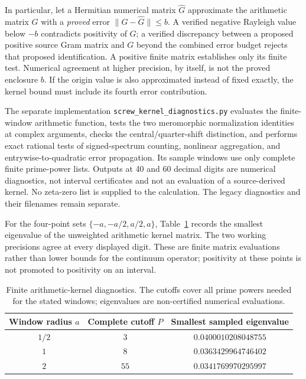 \documentclass[11pt,letterpaper]{article}
\numberwithin{equation}{section}
\theoremstyle{definition}
\theoremstyle{remark}
\begin{document}
In particular, let a Hermitian numerical matrix $\widehat G$ approximate the arithmetic matrix $G$ with a \emph{proved} error $\|G-\widehat G\|\leq b$. A verified negative Rayleigh value below $-b$ contradicts positivity of $G$; a verified discrepancy between a proposed positive source Gram matrix and $G$ beyond the combined error budget rejects that proposed identification. A positive finite matrix establishes only its finite test. Numerical agreement at higher precision, by itself, is not the proved enclosure $b$. If the origin value is also approximated instead of fixed exactly, the kernel bound must include its fourth error contribution.

The separate implementation \texttt{screw\_kernel\_diagnostics.py} evaluates the finite-window arithmetic function, tests the two meromorphic normalization identities at complex arguments, checks the central/quarter-shift distinction, and performs exact rational tests of signed-spectrum counting, nonlinear aggregation, and entrywise-to-quadratic error propagation. Its sample windows use only complete finite prime-power lists. Outputs at 40 and 60 decimal digits are numerical diagnostics, not interval certificates and not an evaluation of a source-derived kernel. No zeta-zero list is supplied to the calculation. The legacy diagnostics and their filenames remain separate.

For the four-point sets $\{-a,-a/2,a/2,a\}$, Table~\ref{tab:screw_diagnostics} records the smallest eigenvalue of the unweighted arithmetic kernel matrix. The two working precisions agree at every displayed digit. These are finite matrix evaluations rather than lower bounds for the continuum operator; positivity at these points is not promoted to positivity on an interval.

\begin{table}[htbp]
\centering
\caption{Finite arithmetic-kernel diagnostics. The cutoffs cover all prime powers needed for the stated windows; eigenvalues are non-certified numerical evaluations.}
\label{tab:screw_diagnostics}
\begin{tabular}{ccc}
\toprule
Window radius $a$ & Complete cutoff $P$ & Smallest sampled eigenvalue\\
\midrule
$1/2$ & $3$ & $0.0400010208048755$\\
$1$ & $8$ & $0.0363429964746402$\\
$2$ & $55$ & $0.0341769970295997$\\
\bottomrule
\end{tabular}
\end{table}
\end{document}
